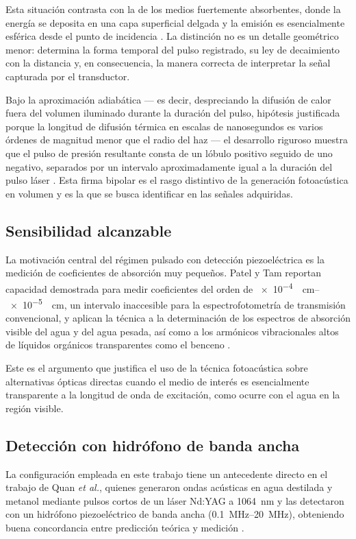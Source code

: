 Esta situación contrasta con la de los medios fuertemente
absorbentes, donde la energía se deposita en una capa superficial
delgada y la emisión es esencialmente esférica desde el punto de
incidencia \cite{PatelTam1981}. La distinción no es un detalle
geométrico menor: determina la forma temporal del pulso registrado,
su ley de decaimiento con la distancia y, en consecuencia, la
manera correcta de interpretar la señal capturada por el
transductor.

Bajo la aproximación adiabática --- es decir, despreciando la
difusión de calor fuera del volumen iluminado durante la duración
del pulso, hipótesis justificada porque la longitud de difusión
térmica en escalas de nanosegundos es varios órdenes de magnitud
menor que el radio del haz --- el desarrollo riguroso muestra que
el pulso de presión resultante consta de un lóbulo positivo seguido
de uno negativo, separados por un intervalo aproximadamente igual a
la duración del pulso láser \cite{PatelTam1981}. Esta firma bipolar
es el rasgo distintivo de la generación fotoacústica en volumen y
es la que se busca identificar en las señales adquiridas.

\subsection*{Sensibilidad alcanzable}

La motivación central del régimen pulsado con detección
piezoeléctrica es la medición de coeficientes de absorción muy
pequeños. Patel y Tam reportan capacidad demostrada para medir
coeficientes del orden de \SIrange{e-4}{e-5}{\per\centi\meter},
un intervalo inaccesible para la espectrofotometría de transmisión
convencional, y aplican la técnica a la determinación de los
espectros de absorción visible del agua y del agua pesada, así como
a los armónicos vibracionales altos de líquidos orgánicos
transparentes como el benceno \cite{PatelTam1981}.

Este es el argumento que justifica el uso de la técnica
fotoacústica sobre alternativas ópticas directas cuando el medio de
interés es esencialmente transparente a la longitud de onda de
excitación, como ocurre con el agua en la región visible.

\subsection*{Detección con hidrófono de banda ancha}

La configuración empleada en este trabajo tiene un antecedente
directo en el trabajo de Quan \textit{et al.}, quienes generaron
ondas acústicas en agua destilada y metanol mediante pulsos cortos
de un láser Nd:YAG a \SI{1064}{\nano\meter} y las detectaron con un
hidrófono piezoeléctrico de banda ancha (\SIrange{0.1}{20}{\mega\hertz}),
obteniendo buena concordancia entre predicción teórica y medición
\cite{Quan1994}.

